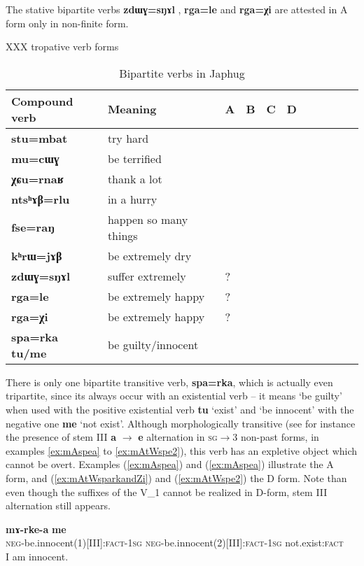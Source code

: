 \documentclass[oldfontcommands,oneside,a4paper,11pt]{article}
\newcommand{\ipa}[1]{{\phon\textbf{#1}}}
\newcommand{\Y}{\Checkmark}
\newcommand{\jpg}[2]{\ipa{#1} `#2'}
\newcommand{\refb}[1]{(\ref{#1})}
\begin{document}
The stative bipartite verbs \ipa{zdɯɣ=sŋɤl} , \ipa{rga=le}  and \ipa{rga=χi}  are attested in A form only in non-finite form.

XXX tropative verb forms

\begin{table}[h]
\caption{Bipartite verbs in Japhug} \label{tab:bipartite} \centering
\begin{tabular}{lllllllllll}
\toprule
Compound verb& Meaning	 & 	A & 	B & 	C & 	D & \\
\midrule
\ipa{stu=mbat} & 	try hard & 	\Y & 	\Y & 	\Y & 	\Y & 	\\	
\ipa{mu=cɯɣ} & 	be  terrified  & 	\Y & 	 & 	 & 	 & 	\\	
\ipa{χɕu=rnaʁ} & 	thank a lot & 	\Y & 	\Y & 	 & 	 & 	\\	
\ipa{ntsʰɤβ=rlu} & 	in a hurry & 	 & 	\Y & 	 & 	\Y & 	\\	
\ipa{fse=raŋ} & 	happen so many things & 	\Y & 	 & 	 & 	 & 	\\	
\ipa{kʰrɯ=jɤβ} & 	be extremely dry & 	\Y & 	 & 	 & 	\Y & 	\\	
\ipa{zdɯɣ=sŋɤl} & 	suffer extremely & 	\Y? & 	 & 	 & 	\Y & 	\\	
\ipa{rga=le} & 	be extremely happy & 	\Y? & 	\Y & 	 & 	 & 	\\	
\ipa{rga=χi} & 	be extremely happy & 	\Y? & 	\Y & 	 & 	 & 	\\	
\midrule
\ipa{spa=rka tu/me} & 	be guilty/innocent & 	\Y & 	 & 	 & 	\Y & 	\\	
\bottomrule
\end{tabular}
\end{table}

There is only one bipartite transitive verb, \ipa{spa=rka}, which is actually even tripartite, since its always occur with an existential verb -- it means `be guilty' when used with the positive existential verb \jpg{tu}{exist} and  `be innocent' with the negative one \jpg{me}{not exist}. Although morphologically transitive (see for instance the presence of stem III \ipa{a} $\rightarrow$ \ipa{e} alternation in \textsc{sg}$\rightarrow$3 non-past forms, in examples \ref{ex:mAspea} to \ref{ex:mAtWspe2}), this verb has an expletive object which cannot be overt. Examples \refb{ex:mAspea} and \refb{ex:mAspea} illustrate the A form, and \refb{ex:mAtWsparkandZi} and \refb{ex:mAtWspe2} the D form. Note than even though the suffixes of the V_1 cannot be realized in D-form, stem III alternation still appears.

\begin{exe}
\ex \label{ex:mAspea}
\gll \ipa{mɤ-spe-a} \ipa{mɤ-rke-a} \ipa{me} \\
\textsc{neg}-be.innocent(1)[III]:\textsc{fact}-\textsc{1sg} \textsc{neg}-be.innocent(2)[III]:\textsc{fact}-\textsc{1sg} not.exist:\textsc{fact} \\
\glt I am innocent.
\end{exe} 
\end{document}
